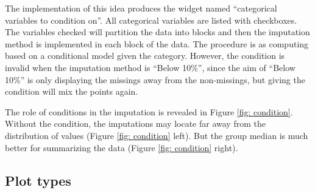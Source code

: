 \documentclass[article]{jss}
\begin{document}
The implementation of this idea produces the widget named ``categorical variables to condition on''. All categorical variables are listed with checkboxes. The variables checked will partition the data into blocks and then the imputation method is implemented in each block of the data. The procedure is as computing based on a conditional model given the category. However, the condition is invalid when the imputation method is ``Below 10\%'', since the aim of ``Below 10\%'' is only displaying the missings away from the non-missings, but giving the condition will mix the points again.

The role of conditions in the imputation is revealed in Figure \ref{fig: condition}. Without the condition, the imputations may locate far away from the distribution of values (Figure \ref{fig: condition} left). But the group median is much better for summarizing the data (Figure \ref{fig: condition} right).

\subsection{Plot types}
\end{document}
